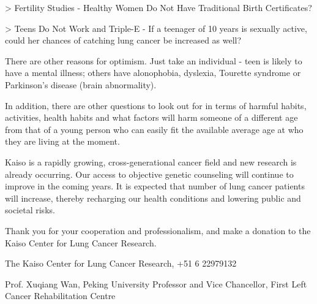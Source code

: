 \documentclass{article}
\begin{document}
> Fertility Studies - Healthy Women Do Not Have Traditional Birth Certificates?

> Teens Do Not Work and Triple-E - If a teenager of 10 years is sexually active, could her chances of catching lung cancer be increased as well?

There are other reasons for optimism. Just take an individual - teen is likely to have a mental illness; others have alonophobia, dyslexia, Tourette syndrome or Parkinson's disease (brain abnormality).

In addition, there are other questions to look out for in terms of harmful habits, activities, health habits and what factors will harm someone of a different age from that of a young person who can easily fit the available average age at who they are living at the moment.

Kaiso is a rapidly growing, cross-generational cancer field and new research is already occurring. Our access to objective genetic counseling will continue to improve in the coming years. It is expected that number of lung cancer patients will increase, thereby recharging our health conditions and lowering public and societal risks.

Thank you for your cooperation and professionalism, and make a donation to the Kaiso Center for Lung Cancer Research.

The Kaiso Center for Lung Cancer Research, +51 6 22979132

Prof. Xuqiang Wan, Peking University Professor and Vice Chancellor, First Left Cancer Rehabilitation Centre
\end{document}
